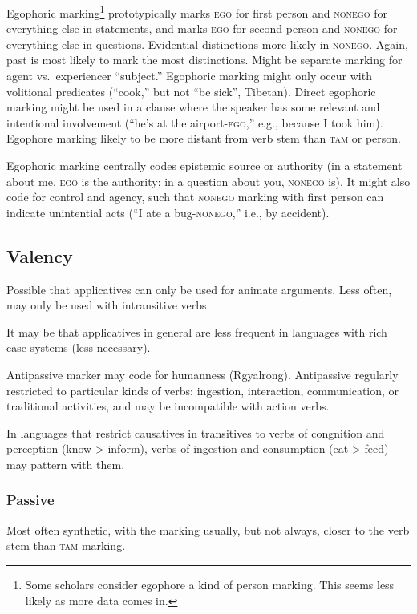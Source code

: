 \documentclass[11pt]{article}
\newcommand{\I}[1]{\textsc{#1}}   %
\begin{document}
{Egophoric marking\footnote{Some scholars consider egophore a kind of
  person marking.  This seems less likely as more data comes in.}
prototypically marks \I{ego} for first person and \I{nonego} for
everything else in statements, and marks \I{ego} for second person and
\I{nonego} for everything else in questions.  Evidential distinctions
more likely in \I{nonego}.  Again, past is most likely to mark the
most distinctions.  Might be separate marking for agent
vs.\ experiencer ``subject.''  Egophoric marking might only occur with
volitional predicates (``cook,'' but not ``be sick'', Tibetan).
Direct egophoric marking might be used in a clause where the speaker
has some relevant and intentional involvement (``he's at the
airport-\I{ego},'' e.g., because I took him).  Egophore marking likely
to be more distant from verb stem than \I{tam} or person.

Egophoric marking centrally codes epistemic source or authority (in a
statement about me, \I{ego} is the authority; in a question about you,
\I{nonego} is).  It might also code for control and agency, such that
\I{nonego} marking with first person can indicate unintential acts
(``I ate a bug-\I{nonego},'' i.e., by accident).


\subsection{Valency}
Possible that applicatives can only be used for animate arguments.
Less often, may only be used with intransitive verbs.

It may be that applicatives in general are less frequent in languages
with rich case systems (less necessary).

Antipassive marker may code for humanness (Rgyalrong).  Antipassive
regularly restricted to particular kinds of verbs: ingestion,
interaction, communication, or traditional activities, and may be
incompatible with action verbs.

In languages that restrict causatives in transitives to verbs of
congnition and perception (know > inform), verbs of ingestion and
consumption (eat > feed) may pattern with them.

\subsubsection{Passive} Most often synthetic, with the marking usually,
but not always, closer to the verb stem than \I{tam} marking.

}
\end{document}
